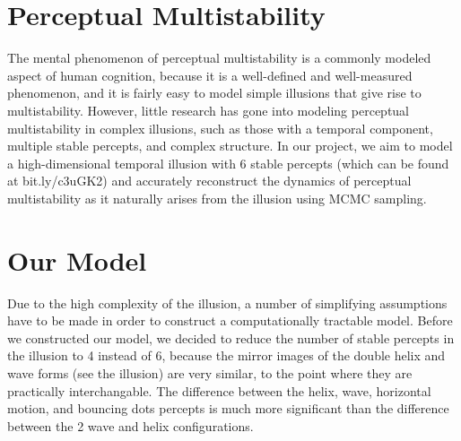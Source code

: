 \documentclass{article} %
\begin{document}




\section{Perceptual Multistability}
The mental phenomenon of perceptual multistability is a commonly modeled aspect of human cognition, because it is a well-defined and well-measured phenomenon, and it is fairly easy to model simple illusions that give rise to multistability.
However, little research has gone into modeling perceptual multistability in complex illusions, such as those with a temporal component, multiple stable percepts, and complex structure. 
In our project, we aim to model a high-dimensional temporal illusion with 6 stable percepts (which can be found at bit.ly/c3uGK2) and accurately reconstruct the dynamics of perceptual multistability as it naturally arises from the illusion using MCMC sampling. 


\section{Our Model}
Due to the high complexity of the illusion, a number of simplifying assumptions have to be made in order to construct a computationally tractable model. Before we constructed our model, we decided to reduce the number of stable percepts in the illusion to 4 instead of 6, because the mirror images of the double helix and wave forms (see the illusion) are very similar, to the point where they are practically interchangable. The difference between the helix, wave, horizontal motion, and bouncing dots percepts is much more significant than the difference between the 2 wave and helix configurations. 
\end{document}
